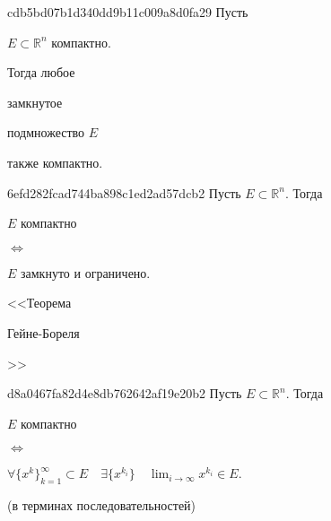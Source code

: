 \begin{note}{cdb5bd07b1d340dd9b11c009a8d0fa29}
    Пусть \begin{icloze}{3}\({ E \subset \mathbb R^{n} }\) компактно.\end{icloze}
    Тогда любое \begin{icloze}{1}замкнутое\end{icloze} подмножество \({ E }\) \begin{icloze}{2}также компактно.\end{icloze}
\end{note}

\begin{note}{6efd282fcad744ba898c1ed2ad57dcb2}
    Пусть \({ E \subset \mathbb R^{n} }\).
    Тогда
    \begin{center}
        \begin{icloze}{2}\({ E }\) компактно\end{icloze} \begin{icloze}{3}\({ \iff }\)\end{icloze} \begin{icloze}{1}\({ E }\) замкнуто и ограничено.\end{icloze}
    \end{center}

    \begin{center}
        \tiny <<Теорема \begin{icloze}{4}Гейне-Бореля\end{icloze}>>
    \end{center}
\end{note}

\begin{note}{d8a0467fa82d4e8db762642af19e20b2}
    Пусть \({ E \subset \mathbb R^{n} }\).
    Тогда
    \begin{center}
        \begin{icloze}{2}\({ E }\) компактно \end{icloze}
        \begin{icloze}{3}\({ \iff }\)\end{icloze}
        \begin{icloze}{1}\({ \displaystyle \forall \{ x^{k} \}_{k = 1}^{\infty} \subset E \quad \exists \{ x^{k_i} \} \quad \lim_{i \to \infty} x^{k_i} \in E }\).\end{icloze}
    \end{center}

    \begin{center}
        \tiny (в терминах последовательностей)
    \end{center}
\end{note}


